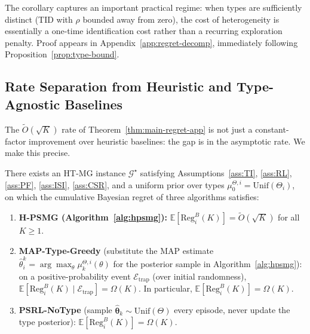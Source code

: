 The corollary captures an important practical regime: when types are sufficiently distinct (TID with $\rho$ bounded away from zero), the cost of heterogeneity is essentially a one-time identification cost rather than a recurring exploration penalty. Proof appears in Appendix~\ref{app:regret-decomp}, immediately following Proposition~\ref{prop:type-bound}.

\subsection{Rate Separation from Heuristic and Type-Agnostic Baselines}
\label{sec:rate-separation}

The $\tilde{O}(\sqrt{K})$ rate of Theorem~\ref{thm:main-regret-app} is not just a constant-factor improvement over heuristic baselines: the gap is in the asymptotic rate. We make this precise.

\begin{theorem}
\label{thm:rate-separation}
There exists an HT-MG instance $\mathcal{G}^\star$ satisfying Assumptions~\ref{ass:TI}, \ref{ass:RL}, \ref{ass:PF}, \ref{ass:ISI}, \ref{ass:CSR}, and a uniform prior over types $\mu_0^{\Theta,i} = \mathrm{Unif}(\Theta_i)$, on which the cumulative Bayesian regret of three algorithms satisfies:
\begin{enumerate}
\item[(i)] \textbf{H-PSMG (Algorithm~\ref{alg:hpsmg}):} $\mathbb{E}[\mathrm{Reg}_i^B(K)] = \tilde{O}(\sqrt{K})$ for all $K \geq 1$.
\item[(ii)] \textbf{MAP-Type-Greedy} (substitute the MAP estimate $\hat{\theta}_i^k = \arg\max_\theta \mu_k^{\Theta,i}(\theta)$ for the posterior sample in Algorithm~\ref{alg:hpsmg}): on a positive-probability event $\mathcal{E}_{\mathrm{trap}}$ (over initial randomness), $\mathbb{E}[\mathrm{Reg}_i^B(K) \mid \mathcal{E}_{\mathrm{trap}}] = \Omega(K)$. In particular, $\mathbb{E}[\mathrm{Reg}_i^B(K)] = \Omega(K)$.
\item[(iii)] \textbf{PSRL-NoType} (sample $\hat{\boldsymbol{\theta}}_k \sim \mathrm{Unif}(\Theta)$ every episode, never update the type posterior): $\mathbb{E}[\mathrm{Reg}_i^B(K)] = \Omega(K)$.
\end{enumerate}
\end{theorem}

